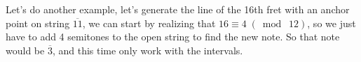 \documentclass[preview]{standalone}
\begin{document}
\begin{center}
Let's do another example, let's generate the line of the 16th fret with an anchor point on string $\overline{11}$, we can start by realizing that $ 16  \equiv 4 \;(\bmod\; 12) $, so we just have to add 4 semitones to the open string to find the new note. So that note would be $\overline{3}$, and this time only work with the intervals.
\end{center}
\end{document}
